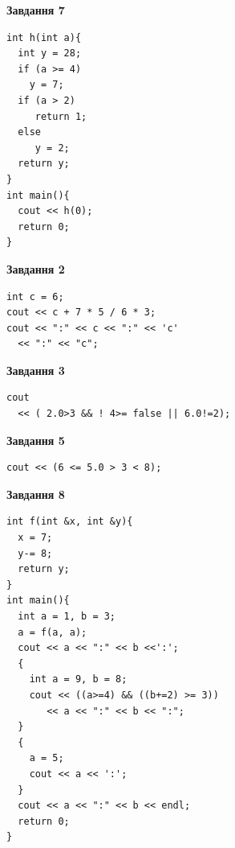 \documentclass[12pt, ukrainian]{article}
\begin{document}
{\begin {large}
\begin{minipage}[t]{7.0cm}
\begin{center}
\textbf{Завдання 7}
\end{center}
\vspace{-8mm}

\begin{verbatim}
int h(int a){
  int y = 28;
  if (a >= 4)
    y = 7;
  if (a > 2)
     return 1;
  else
     y = 2;
  return y;
}
int main(){
  cout << h(0);
  return 0;
}
\end{verbatim}

\end{minipage}
\vline \hspace{1mm}
\begin{minipage}[t]{11.0cm}

\begin{center}
\textbf{Завдання 2}
\end{center}
\vspace{-8mm}

\begin{verbatim}
int c = 6;
cout << c + 7 * 5 / 6 * 3;
cout << ":" << c << ":" << 'c' 
  << ":" << "c";
\end{verbatim}



\begin{center}
\textbf{Завдання 3}
\end{center}
\vspace{-8mm}

\begin{verbatim}
cout 
  << ( 2.0>3 && ! 4>= false || 6.0!=2);
\end{verbatim}



\begin{center}
\textbf{Завдання 5}
\end{center}
\vspace{-8mm}

\begin{verbatim}
cout << (6 <= 5.0 > 3 < 8);
\end{verbatim}



\begin{center}
\textbf{Завдання 8}
\end{center}
\vspace{-8mm}

\begin{verbatim}
int f(int &x, int &y){
  x = 7;
  y-= 8;
  return y;
}
int main(){
  int a = 1, b = 3;
  a = f(a, a);
  cout << a << ":" << b <<':';
  {
    int a = 9, b = 8;
    cout << ((a>=4) && ((b+=2) >= 3))
       << a << ":" << b << ":";
  }
  {
    a = 5;
    cout << a << ':';
  }
  cout << a << ":" << b << endl;
  return 0;
}
\end{verbatim}


\end{minipage}
\end{large}}
\end{document}
